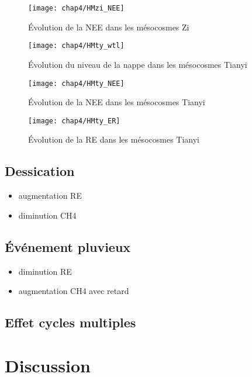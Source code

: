 \begin{figure}
\centering
\texttt{[image: chap4/HMzi\_NEE]}
\caption{Évolution de la NEE dans les mésocosmes Zi}
\label{fig:HMzi_NEE}
\end{figure}


\begin{figure}
\centering
\texttt{[image: chap4/HMty\_wtl]}
\caption{Évolution du niveau de la nappe dans les mésocosmes Tianyi}
\label{fig:HMty_wtl}
\end{figure}

\begin{figure}
\centering
\texttt{[image: chap4/HMty\_NEE]}
\caption{Évolution de la NEE dans les mésocosmes Tianyi}
\label{fig:HMty_NEE}
\end{figure}

\begin{figure}
\centering
\texttt{[image: chap4/HMty\_ER]}
\caption{Évolution de la RE dans les mésocosmes Tianyi}
\label{fig:HMty_ER}
\end{figure}

\subsection{Dessication}

\begin{itemize}
\item augmentation RE
\item diminution CH4
\end{itemize}

\subsection{Événement pluvieux}

\begin{itemize}
\item diminution RE
\item augmentation CH4 avec retard
\end{itemize}

\subsection{Effet cycles multiples}

\section{Discussion}

